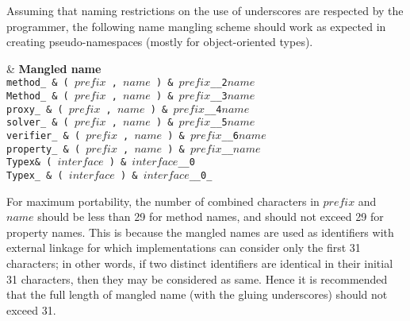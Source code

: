 Assuming that naming restrictions on the use of underscores are
respected by the programmer, the following name mangling scheme should work
as expected in creating pseudo-namespaces (mostly for object-oriented types).


 & {\bf Mangled name}\\

\tt  {method_} & \tt{(} $prefix$ \tt{,} $name$ \tt{)} & $prefix$\tt{__2}$name$\\

\tt  {Method_} & \tt{(} $prefix$ \tt{,} $name$ \tt{)} & $prefix$\tt{__3}$name$\\

\tt   {proxy_} & \tt{(} $prefix$ \tt{,} $name$ \tt{)} & $prefix$\tt{__4}$name$\\

\tt  {solver_} & \tt{(} $prefix$ \tt{,} $name$ \tt{)} & $prefix$\tt{__5}$name$\\

\tt{verifier_} & \tt{(} $prefix$ \tt{,} $name$ \tt{)} & $prefix$\tt{__6}$name$\\

\tt{property_} & \tt{(} $prefix$ \tt{,} $name$ \tt{)} & $prefix$\tt{__}$name$\\

\tt  {Typex}\s & \tt{(} $interface$ \tt{)} & $interface$\tt{__0}\\

\tt  {Typex_}  & \tt{(} $interface$ \tt{)} & $interface$\tt{__0_}\\

\elbat


For maximum portability, the number of combined characters
in $prefix$ and $name$ should be less than 29 for method names,
and should not exceed 29 for property names.
This is because the mangled names are used as identifiers with external
linkage for which implementations can consider only the first 31 characters;
in other words, if two distinct identifiers are identical in
their initial 31 characters, then they may be considered as same.
Hence it is recommended that the full length of mangled
name (with the gluing underscores) should not exceed 31.
